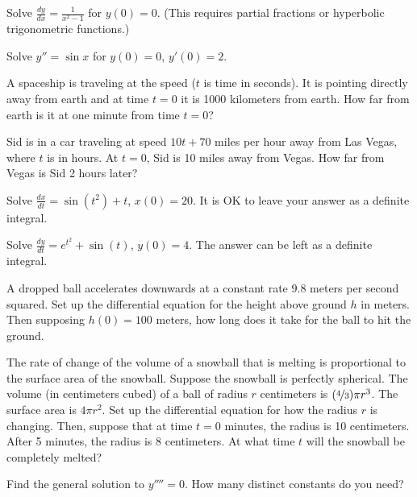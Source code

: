 \begin{exercise}
Solve $\frac{dy}{dx} = \frac{1}{x^2-1}$ for $y(0)=0$. (This requires partial fractions or hyperbolic trigonometric functions.)
\end{exercise}

\begin{exercise}[harder]
Solve $y'' = \sin x$ for $y(0)=0$, $y'(0) = 2$.
\end{exercise}

\begin{exercise}
A spaceship is traveling at the speed  ($t$ is
time in seconds).  It is pointing directly away from earth and at time $t=0$
it is 1000 kilometers from earth.  How far from earth is it at one minute from
time $t=0$?
\end{exercise}

\begin{exercise}\ansMark
Sid is in a car traveling at speed $10t+70$ miles per hour away from Las Vegas,
where $t$ is in hours.  At $t=0$, Sid is 10 miles away from Vegas.  How
far from Vegas is Sid 2 hours later?
\end{exercise}

\begin{exercise}
Solve $\frac{dx}{dt} = \sin(t^2)+t$, $x(0)=20$.  It is OK to leave your
answer as a definite integral.
\end{exercise}

\begin{exercise}
Solve $\frac{dy}{dt} = e^{t^2} + \sin(t)$, $y(0) = 4$. The answer can be left as a definite integral. 
\end{exercise}

\begin{exercise}
A dropped ball accelerates downwards at a constant rate $9.8$ meters per second
squared.  Set up the differential equation for the height above ground $h$ in meters.
Then supposing $h(0) = 100$ meters, how long does it take for the ball to hit
the ground.
\end{exercise}

\begin{exercise}\ansMark
The rate of change of the volume of a snowball that is melting is 
proportional to the surface area of the snowball.  Suppose the
snowball is perfectly spherical.  The volume (in centimeters cubed)
of a ball of radius $r$ centimeters is
$(\nicefrac{4}{3}) \pi r^3$.  The surface area is
$4 \pi r^2$.  Set up the differential equation for how the radius $r$ is changing.
Then, suppose that at time $t=0$ minutes, the radius is 10 centimeters.
After 5 minutes, the radius is 8 centimeters.  At what time $t$ will the 
snowball be completely melted?
\end{exercise}

\begin{exercise}\ansMark%
Find the general solution to $y''''= 0$.  How many distinct constants do you need?
\end{exercise}

\setcounter{exercise}{100}










